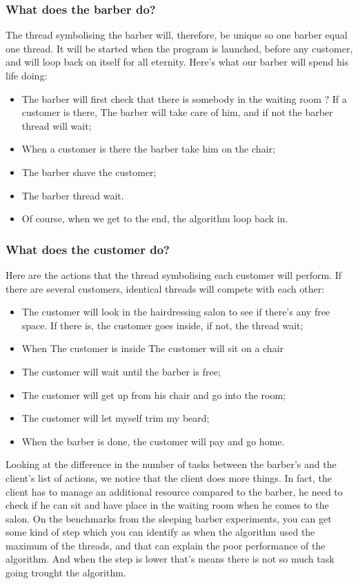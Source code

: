 \documentclass{article}
\begin{document}
\subsubsection{ What does the barber do?}
The thread symbolising the barber will, therefore, be unique so one barber equal one thread. It will be started when the program is launched, before any customer, and will loop back on itself for all eternity.
Here's what our barber will spend his life doing:

\begin{itemize}
    \item The barber will first check that there is somebody in the waiting room ? If a customer is there, The barber will take care of him, and if not the barber thread will wait;
    \item When a customer is there the barber take him on the chair;
    \item The barber shave the customer;
    \item The barber thread wait.
    \item Of course, when we get to the end, the algorithm loop back in.
\end{itemize}

\subsubsection{ What does the customer do?}

Here are the actions that the thread symbolising each customer will perform. If there are several customers, identical threads will compete with each other:

\begin{itemize}
    \item The customer will look in the hairdressing salon to see if there's any free space. If there is, the customer goes inside, if not, the thread wait;
    \item When The customer is inside The customer will sit on a chair
    \item The customer will wait until the barber is free;
    \item The customer will get up from his chair and go into the room;
    \item The customer will let myself trim my beard;
    \item When the barber is done, the customer will pay and go home.
\end{itemize}

Looking at the difference in the number of tasks between the barber's and the client's list of actions, we notice that the client does more things. In fact, the client has to manage an additional resource compared to the barber, he need to check if he can sit and have place in the waiting room when he comes to the salon. On the benchmarks from the sleeping barber experiments, you can get some kind of step which you can identify as when the algorithm used the maximum of the threads, and that can explain the poor performance of the algorithm. And when the step is lower that's means there is not so much task going trought the algorithm.
\end{document}
